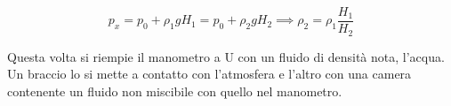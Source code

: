 \[
	p_x = p_0 + \rho_1 g H_1 = p_0 + \rho_2 gH_2 \implies \boxed{\rho_2 = \rho_1\frac{H_1 }{H_2 }  }
\]

Questa volta si riempie il manometro a U con un fluido di densità nota, l'acqua. Un braccio lo si mette a contatto con l'atmosfera e l'altro con una camera contenente un fluido non miscibile con quello nel manometro.

\begin{figure}[htpb]
	\centering


	\begin{tikzpicture}[x=0.75pt,y=0.75pt,yscale=-1,xscale=1]


\end{tikzpicture}
\end{figure}

